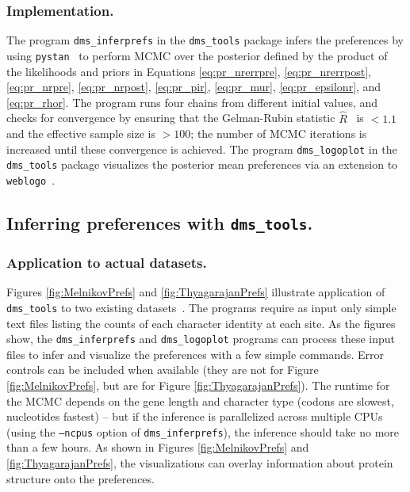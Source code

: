 \documentclass[twocolumn]{bmcart}%
\begin{document}
\subsubsection*{Implementation.}
The program \texttt{dms\_inferprefs} in the \texttt{dms\_tools} package infers the preferences by using \texttt{pystan}~\cite{pystan-software:2014} to perform MCMC over the posterior defined by the product of the likelihoods and priors in Equations \ref{eq:pr_nrerrpre}, \ref{eq:pr_nrerrpost}, \ref{eq:pr_nrpre}, \ref{eq:pr_nrpost}, \ref{eq:pr_pir}, \ref{eq:pr_mur}, \ref{eq:pr_epsilonr}, and \ref{eq:pr_rhor}. The program runs four chains from different initial values, and checks for convergence by ensuring that the Gelman-Rubin statistic $\hat{R}$~\cite{gelman1992inference} is $<1.1$ and the effective sample size is $>100$; the number of MCMC iterations is increased until these convergence is achieved. The program \texttt{dms\_logoplot} in the \texttt{dms\_tools} package visualizes the posterior mean preferences via an extension to \texttt{weblogo}~\cite{crooks2004}.

\subsection*{Inferring preferences with \texttt{dms\_tools}.}

\subsubsection*{Application to actual datasets.}
Figures \ref{fig:MelnikovPrefs} and \ref{fig:ThyagarajanPrefs} illustrate application of \texttt{dms\_tools} to two existing datasets~\cite{melnikov2014comprehensive,thyagarajan2014inherent}. The programs require as input only simple text files listing the counts of each character identity at each site. As the figures show, the \texttt{dms\_inferprefs} and \texttt{dms\_logoplot} programs can process these input files to infer and visualize the preferences with a few simple commands. Error controls can be included when available (they are not for Figure \ref{fig:MelnikovPrefs}, but are for Figure \ref{fig:ThyagarajanPrefs}). The runtime for the MCMC depends on the gene length and character type (codons are slowest, nucleotides fastest) -- but if the inference is parallelized across multiple CPUs (using the \texttt{--ncpus} option of \texttt{dms\_inferprefs}), the inference should take no more than a few hours. As shown in Figures \ref{fig:MelnikovPrefs} and \ref{fig:ThyagarajanPrefs}, the visualizations can overlay information about protein structure onto the preferences.
\end{document}
